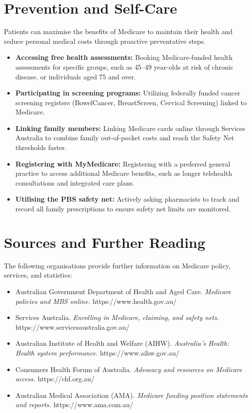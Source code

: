 \section*{Prevention and Self-Care}
Patients can maximise the benefits of Medicare to maintain their health and reduce personal medical costs through proactive preventative steps.
\begin{itemize}
    \item \textbf{Accessing free health assessments:} Booking Medicare-funded health assessments for specific groups, such as 45--49 year-olds at risk of chronic disease, or individuals aged 75 and over.
    \item \textbf{Participating in screening programs:} Utilizing federally funded cancer screening registers (BowelCancer, BreastScreen, Cervical Screening) linked to Medicare.
    \item \textbf{Linking family members:} Linking Medicare cards online through Services Australia to combine family out-of-pocket costs and reach the Safety Net thresholds faster.
    \item \textbf{Registering with MyMedicare:} Registering with a preferred general practice to access additional Medicare benefits, such as longer telehealth consultations and integrated care plans.
    \item \textbf{Utilising the PBS safety net:} Actively asking pharmacists to track and record all family prescriptions to ensure safety net limits are monitored.
\end{itemize}

\section*{Sources and Further Reading}
The following organisations provide further information on Medicare policy, services, and statistics:
\begin{itemize}
    \item Australian Government Department of Health and Aged Care. \textit{Medicare policies and MBS online.} https://www.health.gov.au/
    \item Services Australia. \textit{Enrolling in Medicare, claiming, and safety nets.} https://www.servicesaustralia.gov.au/
    \item Australian Institute of Health and Welfare (AIHW). \textit{Australia's Health: Health system performance.} https://www.aihw.gov.au/
    \item Consumers Health Forum of Australia. \textit{Advocacy and resources on Medicare access.} https://chf.org.au/
    \item Australian Medical Association (AMA). \textit{Medicare funding position statements and reports.} https://www.ama.com.au/
\end{itemize}
